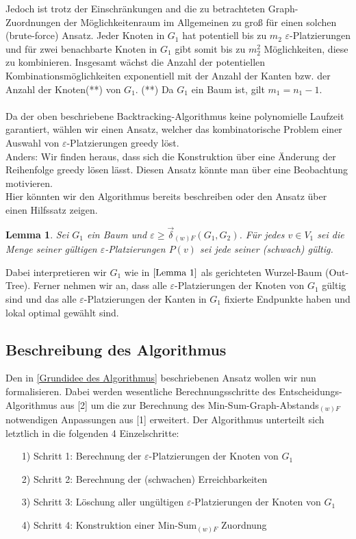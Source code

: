 \documentclass[a4paper, 12pt, twoside]{article}
\theoremstyle{Format1} %
\newtheorem{Lem}[Def]{Lemma}                %
\begin{document}
Jedoch ist trotz der Einschränkungen and die zu betrachteten Graph-Zuordnungen der Möglichkeitenraum im Allgemeinen zu groß
für einen solchen (brute-force) Ansatz. Jeder Knoten in $G_1$ hat potentiell bis zu $m_2$ $\varepsilon$-Platzierungen und für
zwei benachbarte Knoten in $G_1$ gibt somit bis zu $m_2^2$ Möglichkeiten, diese zu kombinieren.
Insgesamt wächst die Anzahl der potentiellen Kombinationsmöglichkeiten exponentiell mit der Anzahl der Kanten bzw. der Anzahl der Knoten(**) von $G_1$.
(**) Da $G_1$ ein Baum ist, gilt $m_1 = n_1-1$.
\\
\\
Da der oben beschriebene Backtracking-Algorithmus keine polynomielle Laufzeit garantiert, wählen wir einen Ansatz, welcher das kombinatorische
Problem einer Auswahl von $\varepsilon$-Platzierungen greedy löst.
\\
Anders: Wir finden heraus, dass sich die Konstruktion über eine Änderung der Reihenfolge greedy lösen lässt.
Diesen Ansatz könnte man über eine Beobachtung motivieren.
\\
Hier könnten wir den Algorithmus bereits beschreiben oder den Ansatz über einen Hilfssatz zeigen.
\begin{Lem}
	Sei $G_1$ ein Baum und $\varepsilon \geq \vec{\delta}_{(w)F}(G_1, G_2)$. Für jedes $v \in V_1$ sei die Menge seiner gültigen
	$\varepsilon$-Platzierungen $P(v)$ sei jede seiner  (schwach) gültig.
\end{Lem}

Dabei interpretieren wir $G_1$ wie in $\ref{Lemma 1}$ als gerichteten
Wurzel-Baum (Out-Tree). Ferner nehmen wir an, dass alle $\varepsilon$-Platzierungen der Knoten von $G_1$ gültig sind und das alle $\varepsilon$-Platzierungen der Kanten
in $G_1$ fixierte Endpunkte haben und lokal optimal gewählt sind.

\subsection{Beschreibung des Algorithmus}
Den in \ref{Grundidee des Algorithmus} beschriebenen Ansatz wollen wir nun formalisieren. Dabei werden wesentliche Berechnungsschritte des Entscheidungs-Algorithmus aus [2]
um die zur Berechnung des Min-Sum-Graph-Abstands$_{(w)F}$ notwendigen Anpassungen aus [1] erweitert.
Der Algorithmus unterteilt sich letztlich in die folgenden 4 Einzelschritte:

\begin{enumerate}
		\item[1)] Schritt 1: Berechnung der $\varepsilon$-Platzierungen der Knoten von $G_1$
		\item[2)] Schritt 2: Berechnung der (schwachen) Erreichbarkeiten
		\item[3)] Schritt 3: Löschung aller ungültigen $\varepsilon$-Platzierungen der Knoten von $G_1$
		\item[4)] Schritt 4: Konstruktion einer Min-Sum$_{(w)F}$ Zuordnung
\end{enumerate}
\end{document}
